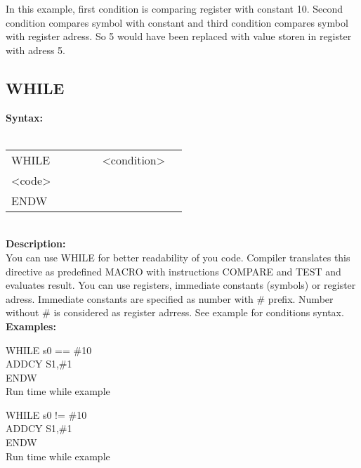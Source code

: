                 In this example, first condition is comparing register with constant 10. Second condition compares symbol with constant and third condition compares
                symbol with register adress. So 5 would have been replaced with value storen in register with adress 5.
                \subsection{WHILE}
                    \textbf{Syntax:}\\
                    \\ {
                        \texttt{}
                            \begin{tabular}[h!]{llll}
                                { \color{highlight_directive} WHILE } & \verb'     ' &
                                { \color{highlight_constant} <condition> }\\
                                { \color{highlight_symbol} <code> }\\
                                { \color{highlight_directive} ENDW }
                            \end{tabular}
                        }\\
                    \textbf{Description:}\\
                    You can use WHILE for better readability of you code. Compiler translates this directive as predefined MACRO with instructions COMPARE and TEST and
                    evaluates result. You can use registers, immediate constants (symbols) or register adress. Immediate constants are specified as number with \# prefix.
                    Number without \# is considered as register adrress. See example for conditions syntax.
                    \textbf{Examples:}\\
                            \begin{code}[h!]
                                    { \color{highlight_directive} WHILE  }
                                    { \color{highlight_constant}   s0 == \#10 }\\
                                    { \color{highlight_instruction} ADDCY    S1,\#1 }\\
                                    { \color{highlight_directive}  ENDW}\\
                                \caption{Run time while example}
                            \end{code}
                            \begin{code}[h!]
                                    { \color{highlight_directive} WHILE  }
                                    { \color{highlight_constant}   s0  != \#10 }\\
                                    { \color{highlight_instruction} ADDCY    S1,\#1 }\\
                                    { \color{highlight_directive}  ENDW}\\
                                \caption{Run time while example}
                            \end{code}
